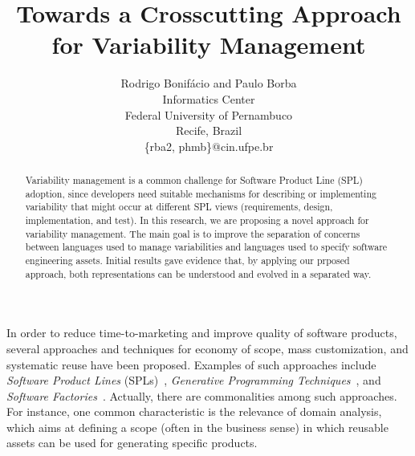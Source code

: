 \documentclass[times, 11pt,twocolumn]{article}
\begin{document}
\lstset{language=Haskell, numbers=left,
numberstyle=\tiny,numbersep=5pt,basicstyle=\scriptsize,aboveskip=10pt}

\title{Towards a Crosscutting Approach for Variability Management}

\author{Rodrigo Bonif\'{a}cio and Paulo Borba\\
Informatics Center \\ Federal University of Pernambuco \\ Recife, Brazil \\
\{rba2, phmb\}@cin.ufpe.br\\ }

\maketitle
\thispagestyle{empty}

\begin{abstract}
Variability management is a common challenge for Software Product
Line (SPL) adoption, since developers need suitable
mechanisms for describing or implementing variability
that might occur at different SPL views (requirements, design,
implementation, and test). In this research, we are proposing a
novel approach for variability management. The main goal is
to improve the separation of concerns between languages used to manage
variabilities and languages used to specify software engineering assets. 
Initial results gave evidence that, by applying our prposed 
approach, both representations can be understood and evolved in
a separated way.
\end{abstract}



\label{sec:intro}

In order to reduce time-to-marketing and improve quality of software products,
several approaches and techniques for economy of scope, mass customization, and
systematic reuse have been proposed. Examples of such approaches include \emph{Software Product
Lines} (SPLs)~\cite{Pohl:2005aa, Clements:2001aa}, \emph{Generative Programming
Techniques}~\cite{Czarnecki:2000aa}, and \emph{Software
Factories}~\cite{Greenfield:2003aa}. Actually, there are commonalities among
such approaches. For instance, one common characteristic is the relevance of
domain analysis, which aims at defining a scope (often in the business sense)
in which reusable assets can be used for generating specific products.
\end{document}
